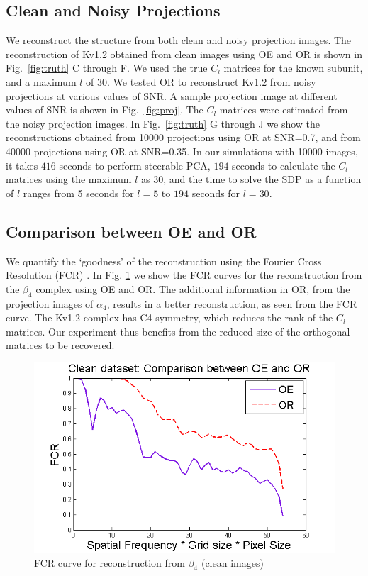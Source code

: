 \documentclass{article}
\begin{document}
\subsection{Clean and Noisy Projections}
We reconstruct the structure from both clean and noisy projection images. The
reconstruction of Kv1.2 obtained from clean images using OE and OR is shown in
Fig.~\ref{fig:truth} C through F. We used the true $C_l$ matrices for the known subunit, and a maximum
$l$ of 30. We tested OR to reconstruct Kv1.2 from noisy projections at various values of
SNR. A sample projection image at different values of SNR is shown in Fig.~\ref{fig:proj}.
The $C_l$ matrices were estimated from the noisy projection images. In
Fig.~\ref{fig:truth} G through J we show the reconstructions obtained from 10000 projections using OR
at SNR=0.7, and from 40000 projections using OR at SNR=0.35. In our simulations with 10000 images, it takes $416$ seconds to perform steerable PCA, $194$ seconds to calculate the $C_l$ matrices using the maximum $l$ as 30, and the time to solve the SDP as a function of $l$ ranges from 5 seconds for $l=5$ to $194$ seconds for $l=30$.

\subsection{Comparison between OE and OR}
We quantify the `goodness' of the reconstruction using the Fourier Cross Resolution (FCR)
\cite{fcr}. In Fig. \ref{fig:fsc} we show the FCR curves for the
reconstruction from the $\beta_4$ complex using OE and OR. The additional information in
OR, from the projection images of $\alpha_4$, results in a better reconstruction, as seen
from the FCR curve. The Kv1.2 complex has C4 symmetry, which reduces the rank of the
$C_l$ matrices. Our experiment thus benefits from the reduced size of the orthogonal
matrices to be recovered. 

\begin{figure}[t]
  \centering
  \includegraphics[scale=0.25]{FSC_final.png}
  \caption{FCR curve for reconstruction from $\beta_4$ (clean images)}\label{fig:fsc}
\end{figure}
 
\end{document}
